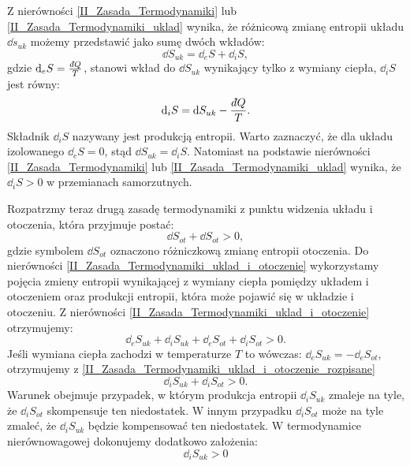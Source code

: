 \documentclass[10pt, a4paper, twoside, onecolumn]{article}
\numberwithin{equation}{section}
\newcommand{\dbar}{d\hspace*{-0.08em}\bar{}\hspace*{0.1em}}
\begin{document}
	Z nierówności \eqref{II_Zasada_Termodynamiki} lub \eqref{II_Zasada_Termodynamiki_uklad} wynika, że różnicową zmianę entropii układu \(\dd{s_{uk}}\) możemy przedstawić jako sumę dwóch wkładów:
	\begin{equation}
		\dd{S_{uk}}=\dd_{e}S+\dd_{i}S,
	\end{equation}
	gdzie \(\dd_{e}S=\frac{\dbar Q}{T}\), stanowi wkład do \(\dd{S_{uk}}\) wynikający tylko z wymiany ciepła, \(\dd_{i}S\) jest równy:
	\begin{equation}
		\dd_{i}S=\dd{S_{uk}}-\frac{\dbar Q}{T}.
	\end{equation}
	Składnik \(\dd_{i}S\) nazywany jest produkcją entropii. Warto zaznaczyć, że dla układu izolowanego \(\dd_{e}S=0\), stąd \(\dd{S_{uk}}=\dd_{i}S\). Natomiast na podstawie nierówności \eqref{II_Zasada_Termodynamiki} lub \eqref{II_Zasada_Termodynamiki_uklad} wynika, że \(\dd_{i}S>0\) w przemianach samorzutnych. \par
	Rozpatrzmy teraz drugą zasadę termodynamiki z punktu widzenia układu i otoczenia, która przyjmuje postać:
	\begin{equation}\label{II_Zasada_Termodynamiki_uklad_i_otoczenie}
		\dd{S_{ot}}+\dd{S_{ot}}>0,
	\end{equation}
	gdzie symbolem \(\dd{S_{ot}}\) oznaczono różniczkową zmianę entropii otoczenia. Do nierówności \eqref{II_Zasada_Termodynamiki_uklad_i_otoczenie} wykorzystamy pojęcia zmieny entropii wynikającej z wymiany ciepła pomiędzy układem i otoczeniem oraz produkcji entropii, która może pojawić się w układzie i otoczeniu. Z nierówności \eqref{II_Zasada_Termodynamiki_uklad_i_otoczenie} otrzymujemy:
	\begin{equation}\label{II_Zasada_Termodynamiki_uklad_i_otoczenie_rozpisane}
		\dd_{e}S_{uk}+\dd_{i}S_{uk}+\dd_{e}S_{ot}+\dd_{i}S_{ot}>0.
	\end{equation}
	Jeśli wymiana ciepła zachodzi w temperaturze \(T\) to wówczas: \(\dd_{e}S_{uk}=-\dd_{e}S_{ot}\), otrzymujemy z \eqref{II_Zasada_Termodynamiki_uklad_i_otoczenie_rozpisane} 
	\begin{equation}\label{}
		\dd_{i}S_{uk}+\dd_{i}S_{ot}>0.
	\end{equation}
	Warunek obejmuje przypadek, w którym produkcja entropii \(\dd_{i}S_{uk}\) zmaleje na tyle, że \(\dd_{i}S_{ot}\) skompensuje ten niedostatek. W innym przypadku \(\dd_{i}S_{ot}\) może na tyle zmaleć, że \(\dd_{i}S_{uk}\) będzie kompensować ten niedostatek. W termodynamice nierównowagowej dokonujemy dodatkowo założenia:
	\begin{equation*}
		\dd_{i}S_{uk}>0
	\end{equation*}
\end{document}

